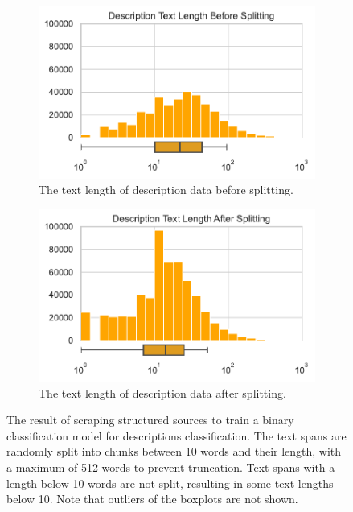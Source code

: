 \documentclass[a4paper, 12pt, oneside]{book} %
\begin{document}
\begin{figure} [htpb]
\begin{subfigure}[b]{0.49\textwidth}
         \includegraphics[width=\textwidth]{histogram_text_length_2.pdf}
         \caption{The text length of description data before splitting.}
         \label{fig:text_length_2}
     \end{subfigure}
     \hfill
     \begin{subfigure}[b]{0.49\textwidth}
         \centering
         \includegraphics[width=\textwidth]{histogram_text_length_4.pdf}
         \caption{The text length of description data after splitting.}
         \label{fig:text_length_4}
     \end{subfigure}
    \caption[Text length distribution for training web crawler model]{The result of scraping structured sources to train  a binary classification model for descriptions classification. The text spans are randomly split into chunks between 10 words and their length, with a maximum of 512 words to prevent truncation. Text spans with a length below 10 words are not split, resulting in some text lengths below 10. Note that outliers of the boxplots are not shown.}
    \label{fig:text_length_distribution}
\end{figure}
\end{document}
